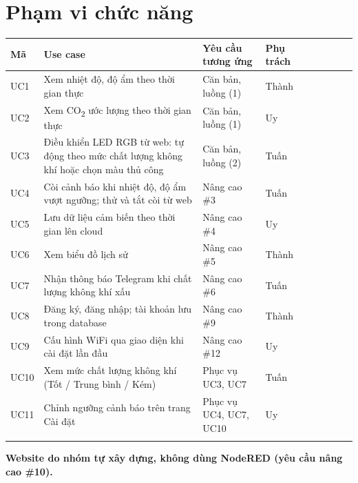 \documentclass[12pt,a4paper]{article}
\newcommand{\outerline}{\Xhline{0.9pt}}
\begin{document}
\noindent\begin{minipage}{\linewidth}
\setlength{\parskip}{6pt}
\section{Phạm vi chức năng}
\begin{tabularx}{\linewidth}{I C{1.2cm} i Y i L{3.3cm} i C{1.7cm} I}
\outerline
\textbf{Mã} & \textbf{Use case} & \textbf{Yêu cầu tương ứng} & \textbf{Phụ trách} \\
\hline
UC1 & Xem nhiệt độ, độ ẩm theo thời gian thực & Căn bản, luồng (1) & Thành \\
\hline
UC2 & Xem CO\textsubscript{2} ước lượng theo thời gian thực & Căn bản, luồng (1) & Uy \\
\hline
UC3 & Điều khiển LED RGB từ web: tự động theo mức chất lượng không khí hoặc chọn màu thủ công & Căn bản, luồng (2) & Tuấn \\
\hline
UC4 & Còi cảnh báo khi nhiệt độ, độ ẩm vượt ngưỡng; thử và tắt còi từ web & Nâng cao \#3 & Tuấn \\
\hline
UC5 & Lưu dữ liệu cảm biến theo thời gian lên cloud & Nâng cao \#4 & Uy \\
\hline
UC6 & Xem biểu đồ lịch sử & Nâng cao \#5 & Thành \\
\hline
UC7 & Nhận thông báo Telegram khi chất lượng không khí xấu & Nâng cao \#6 & Tuấn \\
\hline
UC8 & Đăng ký, đăng nhập; tài khoản lưu trong database & Nâng cao \#9 & Thành \\
\hline
UC9 & Cấu hình WiFi qua giao diện khi cài đặt lần đầu & Nâng cao \#12 & Uy \\
\hline
UC10 & Xem mức chất lượng không khí (Tốt / Trung bình / Kém) & Phục vụ UC3, UC7 & Tuấn \\
\hline
UC11 & Chỉnh ngưỡng cảnh báo trên trang Cài đặt & Phục vụ UC4, UC7, UC10 & Uy \\
\outerline
\end{tabularx}

\vspace{0.5cm}
\noindent\textbf{Website do nhóm tự xây dựng, không dùng NodeRED (yêu cầu nâng cao \#10).}
\end{minipage}
\par\bigskip
\end{document}
